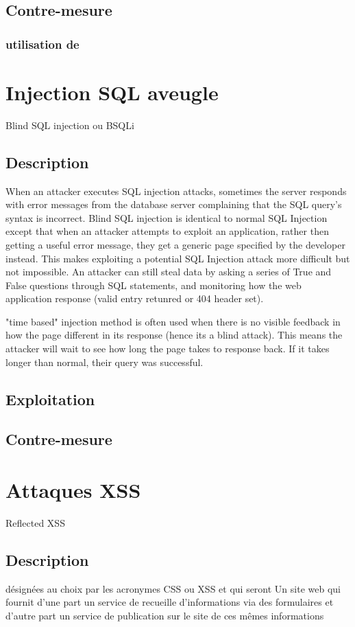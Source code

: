 \subsection{Contre-mesure}
\subsubsection{utilisation de }

\section{Injection SQL aveugle}
Blind SQL injection ou BSQLi
\subsection{Description}
When an attacker executes SQL injection attacks, sometimes the server responds with error messages from the database server complaining that the SQL query's syntax is incorrect. Blind SQL injection is identical to normal SQL Injection except that when an attacker attempts to exploit an application, rather then getting a useful error message, they get a generic page specified by the developer instead. This makes exploiting a potential SQL Injection attack more difficult but not impossible. An attacker can still steal data by asking a series of True and False questions through SQL statements, and monitoring how the web application response (valid entry retunred or 404 header set).

"time based" injection method is often used when there is no visible feedback in how the page different in its response (hence its a blind attack). This means the attacker will wait to see how long the page takes to response back. If it takes longer than normal, their query was successful.

\subsection{Exploitation}

\subsection{Contre-mesure}


\section{Attaques XSS }Reflected XSS

\subsection{Description}
 désignées au choix par les acronymes CSS ou XSS et qui seront
Un site web qui fournit d'une part un service de recueille d'informations via des formulaires et d'autre part un service de publication sur le site de ces mêmes informations

